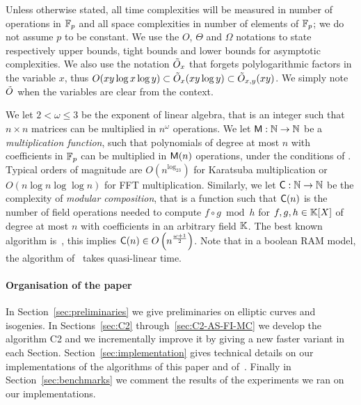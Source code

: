 Unless otherwise stated, all time complexities will be measured in
number of operations in $\mathbb{F}_p$ and all space complexities in number of
elements of $\mathbb{F}_p$; we do not assume $p$ to be constant. We use the
$O$, $\Theta$ and $\Omega$ notations to state respectively upper
bounds, tight bounds and lower bounds for asymptotic complexities. We
also use the notation $\tilde{O}_x$ that forgets polylogarithmic factors
in the variable $x$, thus $O(xy\log x \log y)\subset\tilde{O}_x(xy\log
y)\subset\tilde{O}_{x,y}(xy)$. We simply note $\tilde{O}$ when the variables
are clear from the context.

We let $2<\omega\le3$ be the exponent of linear algebra, that is an
integer such that $n\times n$ matrices can be multiplied in $n^\omega$
operations. We let $\mathrm{\sf M}:\mathbb{N}\rightarrow\mathbb{N}$ be a \emph{multiplication
  function}, such that polynomials of degree at most $n$ with
coefficients in $\mathbb{F}_p$ can be multiplied in $\mathrm{\sf M}(n)$ operations,
under the conditions of \cite[Ch. 8.3]{vzGG}. Typical orders of
magnitude are $O(n^{\log_23})$ for Karatsuba multiplication or
$O(n\log n\log\log n)$ for FFT multiplication. Similarly, we let
$\mathrm{\sf C}:\mathbb{N}\rightarrow\mathbb{N}$ be the complexity of \emph{modular
  composition}, that is a function such that $\mathrm{\sf C}(n)$ is the
number of field operations needed to compute $f\circ g\bmod h$ for
$f,g,h\in\mathbb{K}[X]$ of degree at most $n$ with coefficients in an
arbitrary field $\mathbb{K}$. The best known algorithm is~\cite{BrKu78}, this
implies $\mathrm{\sf C}(n)\in O\left(n^{\frac{\omega+1}{2}}\right)$. Note
that in a boolean RAM model, the algorithm of~\cite{KeUm08} takes
quasi-linear time.

\paragraph{Organisation of the paper}
In Section~\ref{sec:preliminaries} we give preliminaries on elliptic
curves and isogenies. In Sections~\ref{sec:C2}
through~\ref{sec:C2-AS-FI-MC} we develop the algorithm C2 and we
incrementally improve it by giving a new faster variant in each
Section. Section~\ref{sec:implementation} gives technical details on
our implementations of the algorithms of this paper and
of~\cite{LeSi09}. Finally in Section~\ref{sec:benchmarks} we comment
the results of the experiments we ran on our implementations.



%
